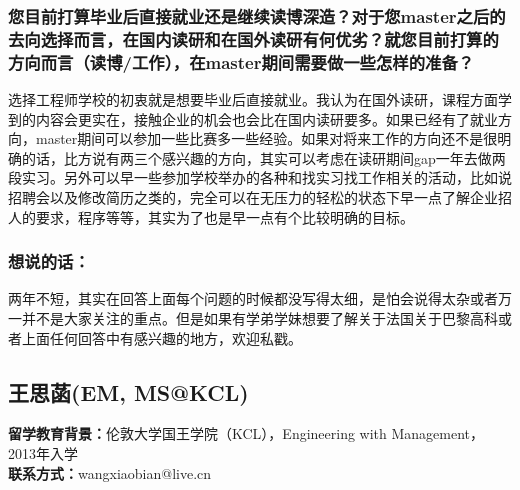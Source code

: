 \documentclass[a4paper,UTF8]{book}
\begin{document}
    \subsubsection*{您目前打算毕业后直接就业还是继续读博深造？对于您master之后的去向选择而言，在国内读研和在国外读研有何优劣？就您目前打算的方向而言（读博/工作），在master期间需要做一些怎样的准备？}
    选择工程师学校的初衷就是想要毕业后直接就业。我认为在国外读研，课程方面学到的内容会更实在，接触企业的机会也会比在国内读研要多。如果已经有了就业方向，master期间可以参加一些比赛多一些经验。如果对将来工作的方向还不是很明确的话，比方说有两三个感兴趣的方向，其实可以考虑在读研期间gap一年去做两段实习。另外可以早一些参加学校举办的各种和找实习找工作相关的活动，比如说招聘会以及修改简历之类的，完全可以在无压力的轻松的状态下早一点了解企业招人的要求，程序等等，其实为了也是早一点有个比较明确的目标。
        
    \subsubsection{想说的话：}
    两年不短，其实在回答上面每个问题的时候都没写得太细，是怕会说得太杂或者万一并不是大家关注的重点。但是如果有学弟学妹想要了解关于法国关于巴黎高科或者上面任何回答中有感兴趣的地方，欢迎私戳。


\clearpage
\subsection{王思菡(EM, MS@KCL)}
    \textbf{留学教育背景：}伦敦大学国王学院（KCL），Engineering with Management，2013年入学\\
    \textbf{联系方式：}wangxiaobian@live.cn
\end{document}
